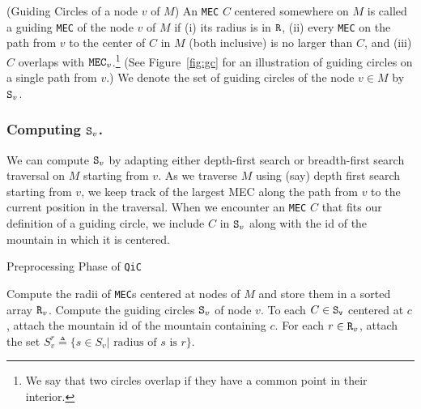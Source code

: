 \documentclass[12pt]{llncs}
\begin{document}
\begin{definition} (Guiding Circles of a node $v$ of $M$) \label{def1}
An {\tt MEC} $C$ centered somewhere on $M$ is called a guiding {\tt MEC} of the 
node 
$v$ of $M$ if (i) its radius is in ${\tt R}$, (ii) every {\tt MEC}  on the path from 
$v$ to the center of $C$ in $M$ (both inclusive) is no larger than $C$, and (iii) $C$ 
overlaps with ${\tt MEC}_v$.\footnote{We say that two circles overlap if they have a 
common point in their interior.} (See Figure\ \ref{fig:gc} for an illustration of guiding 
circles on a single path from $v$.) We denote the set of guiding circles of the node $v \in M$ by ${\tt S}_v$.
\end{definition}
\vspace{-0.2in}
\subsubsection{Computing ${\tt S}_v$.} \label{GC}
We can compute ${\tt S}_v$ by adapting  either depth-first search 
or breadth-first search 
traversal on $M$ starting from $v$. As we traverse $M$ using (say) depth first search 
starting from $v$, we keep track of the largest MEC along the path from $v$ to the 
current position in the traversal. When we encounter an {\tt MEC} $C$  that fits our 
definition of a guiding circle, we include $C$ in ${\tt S}_v$ along with the id of the 
mountain in which it is centered. 


\begin{algorithm}[h!]
\caption{Preprocessing Phase of {\tt QiC}}
\label{alg:QiCPrep}
\begin{algorithmic}[1]
\STATE Compute the radii of {\tt MEC}s centered at nodes of $M$ and store them in a sorted array $
{\tt R}_v$.
\STATE Compute the guiding circles ${\tt S}_v$ of node $v$. 
\STATE To each $C \in {\tt S_v}$ centered at $c$, attach  the mountain id of the mountain containing $c$.
\STATE For each $r \in {\tt R}_v$, attach the set $S_v^r \triangleq \{ s \in S_v |
\text{ radius of $s$ is $r$\}}$. 
\end{algorithmic}
\end{algorithm}
\end{document}
